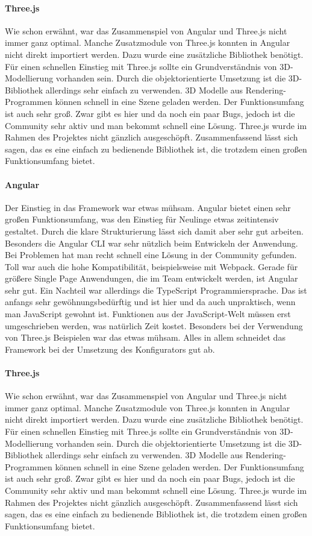 \paragraph{Three.js}
Wie schon erwähnt, war das Zusammenspiel von Angular und Three.js nicht immer ganz optimal. Manche Zusatzmodule von Three.js konnten in Angular nicht direkt importiert werden. Dazu wurde eine zusätzliche Bibliothek benötigt. Für einen schnellen Einstieg mit Three.js sollte ein Grundverständnis von 3D-Modellierung vorhanden sein. Durch die objektorientierte Umsetzung ist die 3D-Bibliothek allerdings sehr einfach zu verwenden. 3D Modelle aus Rendering-Programmen können schnell in eine Szene geladen werden. Der Funktionsumfang ist auch sehr groß. Zwar gibt es hier und da noch ein paar Bugs, jedoch ist die Community sehr aktiv und man bekommt schnell eine Lösung. Three.js wurde im Rahmen des Projektes nicht gänzlich ausgeschöpft. Zusammenfassend lässt sich sagen, das es eine einfach zu bedienende Bibliothek ist, die trotzdem einen großen Funktionsumfang bietet.
\paragraph{Angular}
Der Einstieg in das Framework war etwas mühsam. Angular bietet einen sehr großen Funktionsumfang, was den Einstieg für Neulinge etwas zeitintensiv gestaltet. Durch die klare Strukturierung lässt sich damit aber sehr gut arbeiten. Besonders die Angular CLI war sehr nützlich beim Entwickeln der Anwendung. Bei Problemen hat man recht schnell eine Lösung in der Community gefunden. Toll war auch die hohe Kompatibilität, beispielsweise mit Webpack. Gerade für größere Single Page Anwendungen, die im Team entwickelt werden, ist Angular sehr gut. Ein Nachteil war allerdings die TypeScript Programmiersprache. Das ist anfangs sehr gewöhnungsbedürftig und ist hier und da auch unpraktisch, wenn man JavaScript gewohnt ist. Funktionen aus der JavaScript-Welt müssen erst umgeschrieben werden, was natürlich Zeit kostet. Besonders bei der Verwendung von Three.js Beispielen war das etwas mühsam. Alles in allem schneidet das Framework bei der Umsetzung des Konfigurators gut ab.
\paragraph{Three.js}
Wie schon erwähnt, war das Zusammenspiel von Angular und Three.js nicht immer ganz optimal. Manche Zusatzmodule von Three.js konnten in Angular nicht direkt importiert werden. Dazu wurde eine zusätzliche Bibliothek benötigt. Für einen schnellen Einstieg mit Three.js sollte ein Grundverständnis von 3D-Modellierung vorhanden sein. Durch die objektorientierte Umsetzung ist die 3D-Bibliothek allerdings sehr einfach zu verwenden. 3D Modelle aus Rendering-Programmen können schnell in eine Szene geladen werden. Der Funktionsumfang ist auch sehr groß. Zwar gibt es hier und da noch ein paar Bugs, jedoch ist die Community sehr aktiv und man bekommt schnell eine Lösung. Three.js wurde im Rahmen des Projektes nicht gänzlich ausgeschöpft. Zusammenfassend lässt sich sagen, das es eine einfach zu bedienende Bibliothek ist, die trotzdem einen großen Funktionsumfang bietet.